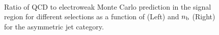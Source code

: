\begin{figure}[h!]
\begin{center}
     ~~
     \\
      \caption{ Ratio of QCD to electroweak Monte Carlo prediction in
      the signal region for different \scalht selections as a function
      of \mht (Left) and $n_{\text{b}}$ (Right) for the asymmetric jet
      category. %
    }
    \label{fig:sym_qcd_validation}
  \end{center} 
\end{figure}

